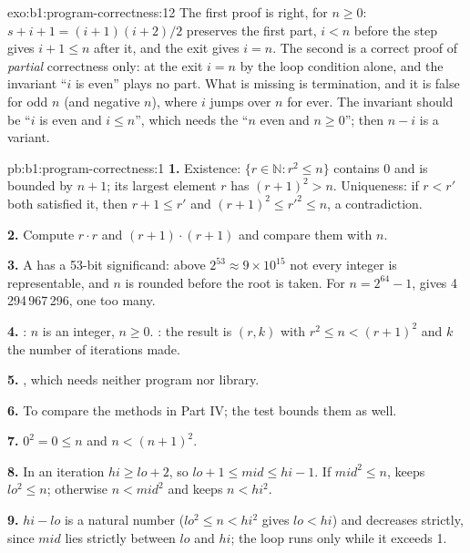 \begin{solution}{exo:b1:program-correctness:12}
The first proof is right, for $n \geq 0$: $s + i + 1 = (i + 1)(i + 2)/2$ preserves the first part, $i < n$ before the
step gives $i + 1 \leq n$ after it, and the exit gives $i = n$. The second is a correct proof of \emph{partial}
correctness only: at the exit $i = n$ by the loop condition alone, and the invariant ``$i$ is even'' plays no part. What
is missing is termination, and it is false for odd $n$ (and negative $n$), where $i$ jumps over $n$ for ever. The
invariant should be ``$i$ is even and $i \leq n$'', which needs the  ``$n$ even and $n \geq 0$''; then
$n - i$ is a variant.
\end{solution}

\begin{solution}{pb:b1:program-correctness:1}
\textbf{1.} Existence: $\{r \in \mathbb{N} : r^2 \leq n\}$ contains 0 and is bounded by $n + 1$; its largest element
$r$ has $(r + 1)^2 > n$. Uniqueness: if $r < r'$ both satisfied it, then $r + 1 \leq r'$ and $(r + 1)^2 \leq r'^2 \leq
n$, a contradiction.

\textbf{2.} Compute $r \cdot r$ and $(r + 1) \cdot (r + 1)$ and compare them with $n$.

\textbf{3.} A  has a 53-bit significand: above $2^{53} \approx 9 \times 10^{15}$ not every integer is
representable, and $n$ is rounded before the root is taken. For $n = 2^{64} - 1$, 
gives 4\,294\,967\,296, one too many.

\textbf{4.} : $n$ is an integer, $n \geq 0$. : the result is $(r, k)$ with $r^2 \leq n < (r +
1)^2$ and $k$ the number of iterations made.

\textbf{5.} , which needs neither program nor library.

\textbf{6.} To compare the methods in Part IV; the test bounds them as well.

\textbf{7.} $0^2 = 0 \leq n$ and $n < (n + 1)^2$.

\textbf{8.} In an iteration $hi \geq lo + 2$, so $lo + 1 \leq mid \leq hi - 1$. If $mid^2 \leq n$, 
keeps $lo^2 \leq n$; otherwise $n < mid^2$ and  keeps $n < hi^2$.

\textbf{9.} $hi - lo$ is a natural number ($lo^2 \leq n < hi^2$ gives $lo < hi$) and decreases strictly, since $mid$
lies strictly between $lo$ and $hi$; the loop runs only while it exceeds 1.


\end{solution}
